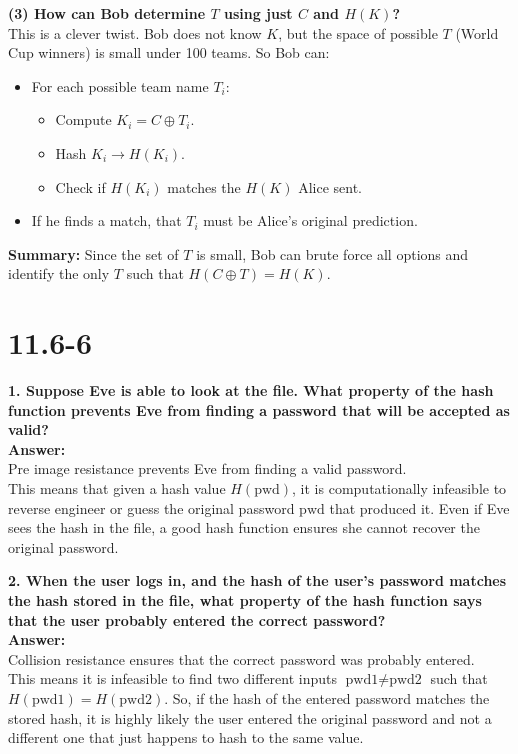 \documentclass[12pt]{article}
\begin{document}
\textbf{(3) How can Bob determine \( T \) using just \( C \) and \( H(K) \)?} \\
This is a clever twist. Bob does not know \( K \), but the space of possible \( T \) (World Cup winners) is small under 100 teams. So Bob can:
\begin{itemize}
    \item For each possible team name \( T_i \):
    \begin{itemize}
        \item Compute \( K_i = C \oplus T_i \).
        \item Hash \( K_i \rightarrow H(K_i) \).
        \item Check if \( H(K_i) \) matches the \( H(K) \) Alice sent.
    \end{itemize}
    \item If he finds a match, that \( T_i \) must be Alice's original prediction.
\end{itemize}

\textbf{Summary:} Since the set of \( T \) is small, Bob can brute force all options and identify the only \( T \) such that \( H(C \oplus T) = H(K) \).
\newpage
\section*{11.6-6}
\textbf{1. Suppose Eve is able to look at the file. What property of the hash function prevents Eve from finding a password that will be accepted as valid?} \\
\textbf{Answer:} \\
Pre image resistance prevents Eve from finding a valid password. \\
This means that given a hash value \( H(\text{pwd}) \), it is computationally infeasible to reverse engineer or guess the original password \( \text{pwd} \) that produced it. Even if Eve sees the hash in the file, a good hash function ensures she cannot recover the original password.

\textbf{2. When the user logs in, and the hash of the user's password matches the hash stored in the file, what property of the hash function says that the user probably entered the correct password?} \\
\textbf{Answer:} \\
Collision resistance ensures that the correct password was probably entered. \\
This means it is infeasible to find two different inputs \( \text{pwd1} \neq \text{pwd2} \) such that \( H(\text{pwd1}) = H(\text{pwd2}) \). So, if the hash of the entered password matches the stored hash, it is highly likely the user entered the original password and not a different one that just happens to hash to the same value.
\newpage
\end{document}

